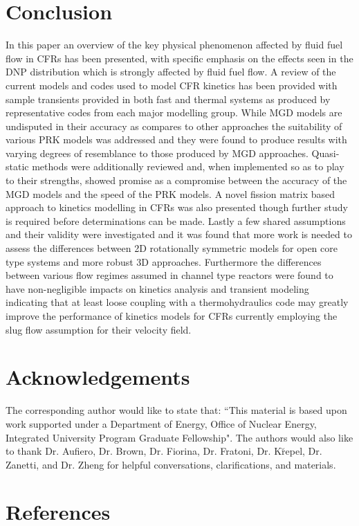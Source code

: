 \documentclass[review]{elsarticle}
\begin{document}
\section{Conclusion} \label{sec:conc}
In this paper an overview of the key physical phenomenon affected by fluid fuel
flow in CFRs has been presented, with specific emphasis on the effects seen
in the DNP distribution which is strongly affected by fluid fuel flow.
A review of the current models and codes used to
model CFR kinetics has been provided with sample transients provided in both
fast and thermal systems as produced by representative codes from each major
modelling group. While MGD models are undisputed in their accuracy as compares
to other approaches the suitability of various PRK models was addressed
and they were found to produce results with varying degrees of resemblance to
those produced by MGD approaches. Quasi-static methods were additionally
reviewed and, when implemented so as to play to their strengths, showed promise
as a compromise between the accuracy of the MGD models and the speed of the PRK
models. A novel fission matrix based approach to kinetics modelling in CFRs was
also presented though further study is required before determinations can be
made. Lastly a few shared assumptions and their validity were investigated and
it was found that more work is needed to assess the differences between 2D 
rotationally symmetric models for open core type systems and more robust 3D
approaches. Furthermore the differences between various flow regimes assumed
in channel type reactors were found to have non-negligible impacts on kinetics
analysis and transient modeling indicating that at least loose coupling with
a thermohydraulics code may greatly improve the performance of kinetics models
for CFRs currently employing the slug flow assumption for their velocity field.

\section{Acknowledgements} \label{sec:ack}
The corresponding author would like to state that: ``This material is based
upon work supported under a Department of Energy, Office of Nuclear Energy,
Integrated University Program Graduate Fellowship". The authors would also
like to thank Dr. Aufiero, Dr. Brown, Dr. Fiorina, Dr. Fratoni, 
Dr. K{\u r}epel, 
Dr. Zanetti, and Dr. Zheng for helpful conversations, clarifications, and
materials.  

\section*{References}


\end{document}
